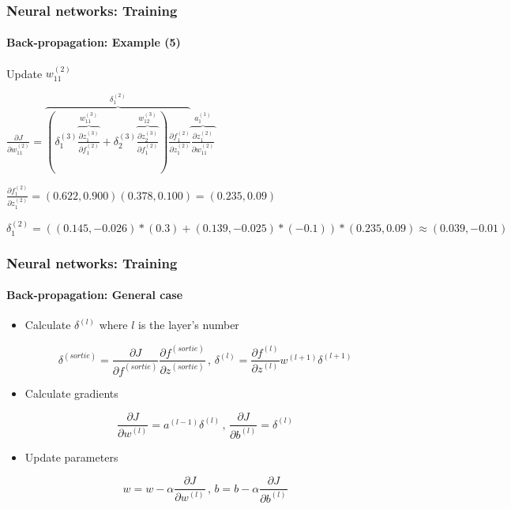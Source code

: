 \documentclass[xcolor=table]{beamer}
\begin{document}
\begin{frame}
	\frametitle{Neural networks: Training}
	\framesubtitle{Back-propagation: Example (5)}
	
	Update $w_{11}^{(2)}$
	
	$
	\frac{\partial J}{\partial w_{11}^{(2)}} = 
	\overbrace{ 
		\left(
		\delta_{1}^{(3)} 
		\overbrace{
			\frac{\partial z_{1}^{(3)}}{\partial f_{1}^{(2)}}
		}^{w_{11}^{(3)}}
		+
		\delta_{2}^{(3)} 
		\overbrace{
			\frac{\partial z_{2}^{(3)}}{\partial f_{1}^{(2)}}
		}^{w_{12}^{(3)}}
		\right)
		\frac{\partial f_{1}^{(2)}}{\partial z_{1}^{(2)}}
	}^{\delta_{1}^{(2)}} 
	\overbrace{
		\frac{\partial z_{1}^{(2)}}{\partial w_{11}^{(2)}}
	}^{a_{1}^{(1)}}
	$
	
	$
	\frac{\partial f_{1}^{(2)}}{\partial z_{1}^{(2)}} = (0.622, 0.900) (0.378, 0.100) = (0.235, 0.09)
	$
	
	$
	\delta_{1}^{(2)} = \left((0.145, -0.026) * (0.3) + (0.139, -0.025) * (-0.1)\right) * (0.235, 0.09) \approx (0.039, -0.01)
	$
	
	
	
\end{frame}

\begin{frame}
	\frametitle{Neural networks: Training}
	\framesubtitle{Back-propagation: General case}
	
	\begin{itemize}
		\item Calculate $\delta^{(l)}$ where $l$ is the layer's number
	\end{itemize}
	
	\[ 
	\delta^{(sortie)} = 
	\frac{\partial J}{\partial f^{(sortie)}} \frac{\partial f^{(sortie)}}{\partial z^{(sortie)}}
	\,,\,
	\delta^{(l)} = \frac{\partial f^{(l)}}{\partial z^{(l)}} w^{(l+1)} \delta^{(l+1)}
	\]
	
	\begin{itemize}
		\item Calculate gradients
	\end{itemize}
	
	\[ 
	\frac{\partial J}{\partial w^{(l)}} = a^{(l-1)} \delta^{(l)}
	\,,\,
	\frac{\partial J}{\partial b^{(l)}} = \delta^{(l)}
	\]
	
	\begin{itemize}
		\item Update parameters
	\end{itemize}
	
	\[ 
	w = w - \alpha \frac{\partial J}{\partial w^{(l)}}
	\,,\,
	b = b - \alpha \frac{\partial J}{\partial b^{(l)}}
	\]
	
	
\end{frame}
\end{document}
